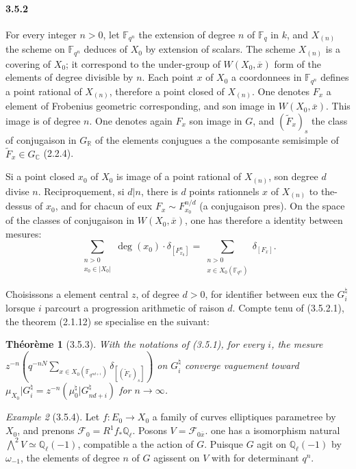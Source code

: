 \documentclass[12pt,a4paper]{article}
\theoremstyle{plain}
\newtheorem{theorem}{Th\'eor\`eme}[section]
\theoremstyle{definition}
\theoremstyle{remark}
\newtheorem{example}[theorem]{Example}
\newcommand{\CC}{{\mathbb{C}}}
\newcommand{\FF}{{\mathbb{F}}}
\newcommand{\QQ}{{\mathbb{Q}}}
\newcommand{\RR}{{\mathbb{R}}}
\begin{document}
\paragraph{3.5.2}
For every integer $n > 0$, let $\FF_{q^n}$ the extension of degree $n$ of $\FF_q$ in $k$, and $X_{(n)}$ the scheme on $\FF_{q^n}$ deduces of $X_0$ by extension of scalars. The scheme $X_{(n)}$ is a covering of $X_0$; it correspond to the under-group of $W(X_0, \overline{x})$ form of the elements of degree divisible by $n$. Each point $x$ of $X_0$ a coordonnees in $\FF_{q^n}$ defines a point rational of $X_{(n)}$, therefore a point closed of $X_{(n)}$. One denotes $F_x$ a element of Frobenius geometric corresponding, and son image in $W(X_0, \overline{x})$. This image is of degree $n$. One denotes again $F_x$ son image in $G$, and $(\tilde{F}_x)_s$ the class of conjugaison in $G_\RR$ of the elements conjugues a the composante semisimple of $\tilde{F}_x \in G_\CC$ (2.2.4).

Si a point closed $x_0$ of $X_0$ is image of a point rational of $X_{(n)}$, son degree $d$ divise $n$. Reciproquement, si $d|n$, there is $d$ points rationnels $x$ of $X_{(n)}$ to the-dessus of $x_0$, and for chacun of eux $F_x \sim F_{x_0}^{n/d}$ (a conjugaison pres). On the space of the classes of conjugaison in $W(X_0, \overline{x})$, one has therefore a identity between mesures:
\begin{equation}\label{eq:3.5.2.1}
\sum_{\substack{n > 0 \\ x_0 \in |X_0|}} \deg(x_0) \cdot \delta_{[F_{x_0}^n]} = \sum_{\substack{n > 0 \\ x \in X_0(\FF_{q^n})}} \delta_{[F_x]}.
\end{equation}

Choisissons a element central $z$, of degree $d > 0$, for identifier between eux the $G_i^\natural$ lorsque $i$ parcourt a progression arithmetic of raison $d$. Compte tenu of (3.5.2.1), the theorem (2.1.12) se specialise en the suivant:


\begin{theorem}[3.5.3]
With the notations of (3.5.1), for every $i$, the mesure $z^{-n}(q^{-nN} \sum_{x \in X_0(\FF_{q^{nd+i}})} \delta_{[(\tilde{F}_x)_s]})$ on $G_i^\natural$ converge vaguement toward $\mu_{X_0}|G_i^\natural = z^{-n}(\mu_0^\natural|G_{nd+i}^\natural)$ for $n \to \infty$.
\end{theorem}

\begin{example}[3.5.4]
Let $f : E_0 \to X_0$ a family of curves elliptiques parametree by $X_0$, and prenons $\mathscr{F}_0 = R^1 f_* \QQ_\ell$. Posons $V = \mathscr{F}_{0\overline{x}}$. one has a isomorphism natural $\bigwedge^2 V \simeq \QQ_\ell(-1)$, compatible a the action of $G$. Puisque $G$ agit on $\QQ_\ell(-1)$ by $\omega_{-1}$, the elements of degree $n$ of $G$ agissent on $V$ with for determinant $q^n$.
\end{example}
\end{document}
